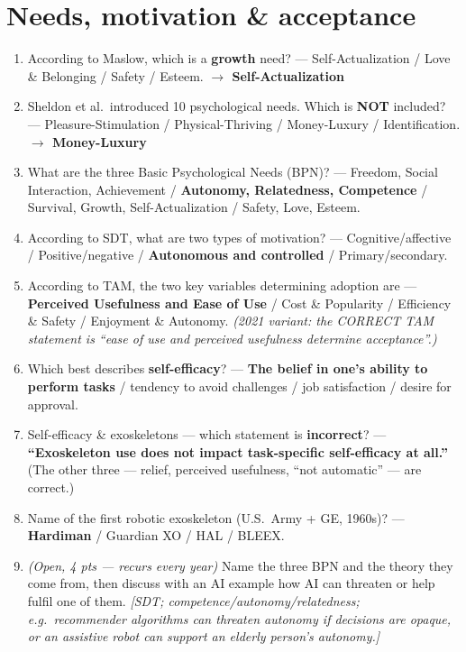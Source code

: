 \documentclass[11pt, oneside]{book}
\begin{document}
\section{Needs, motivation \& acceptance}

\begin{enumerate}[leftmargin=1.6em, itemsep=4pt]
\item According to Maslow, which is a \textbf{growth} need? — Self-Actualization
/ Love \& Belonging / Safety / Esteem. \hfill\textbf{$\to$ Self-Actualization}
\item Sheldon et al.\ introduced 10 psychological needs. Which is
\textbf{NOT} included? — Pleasure-Stimulation / Physical-Thriving /
Money-Luxury / Identification. \hfill\textbf{$\to$ Money-Luxury}
\item What are the three Basic Psychological Needs (BPN)? — Freedom, Social
Interaction, Achievement / \textbf{Autonomy, Relatedness, Competence} / Survival,
Growth, Self-Actualization / Safety, Love, Esteem.
\item According to SDT, what are two types of motivation? —
Cognitive/affective / Positive/negative / \textbf{Autonomous and controlled} /
Primary/secondary.
\item According to TAM, the two key variables determining adoption are —
\textbf{Perceived Usefulness and Ease of Use} / Cost \& Popularity / Efficiency
\& Safety / Enjoyment \& Autonomy. \emph{(2021 variant: the CORRECT TAM
statement is ``ease of use and perceived usefulness determine acceptance''.)}
\item Which best describes \textbf{self-efficacy}? — \textbf{The belief in one's
ability to perform tasks} / tendency to avoid challenges / job satisfaction /
desire for approval.
\item Self-efficacy \& exoskeletons — which statement is \textbf{incorrect}? —
\textbf{``Exoskeleton use does not impact task-specific self-efficacy at all.''}
(The other three — relief, perceived usefulness, ``not automatic'' — are
correct.)
\item Name of the first robotic exoskeleton (U.S.\ Army + GE, 1960s)? —
\textbf{Hardiman} / Guardian XO / HAL / BLEEX.
\item \emph{(Open, 4 pts — recurs every year)} Name the three BPN and the
theory they come from, then discuss with an AI example how AI can threaten or
help fulfil one of them. \emph{[SDT; competence/autonomy/relatedness; e.g.\
recommender algorithms can threaten autonomy if decisions are opaque, or an
assistive robot can support an elderly person's autonomy.]}
\end{enumerate}
\end{document}
